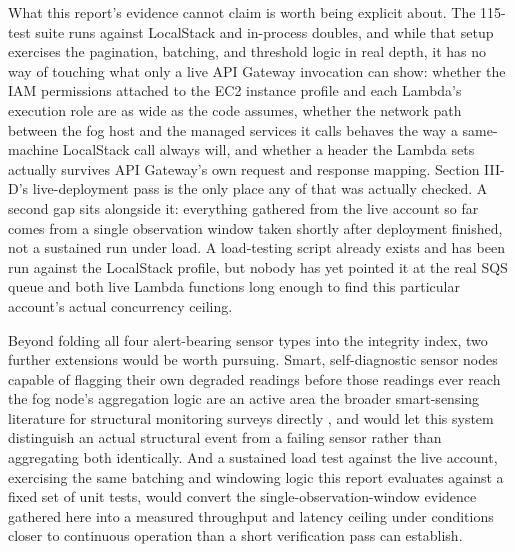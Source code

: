 \documentclass[conference]{IEEEtran}
\begin{document}
What this report's evidence cannot claim is worth being explicit about. The 115-test suite runs against LocalStack and in-process doubles, and while that setup exercises the pagination, batching, and threshold logic in real depth, it has no way of touching what only a live API Gateway invocation can show: whether the IAM permissions attached to the EC2 instance profile and each Lambda's execution role are as wide as the code assumes, whether the network path between the fog host and the managed services it calls behaves the way a same-machine LocalStack call always will, and whether a header the Lambda sets actually survives API Gateway's own request and response mapping. Section III-D's live-deployment pass is the only place any of that was actually checked. A second gap sits alongside it: everything gathered from the live account so far comes from a single observation window taken shortly after deployment finished, not a sustained run under load. A load-testing script already exists and has been run against the LocalStack profile, but nobody has yet pointed it at the real SQS queue and both live Lambda functions long enough to find this particular account's actual concurrency ceiling.

Beyond folding all four alert-bearing sensor types into the integrity index, two further extensions would be worth pursuing. Smart, self-diagnostic sensor nodes capable of flagging their own degraded readings before those readings ever reach the fog node's aggregation logic are an active area the broader smart-sensing literature for structural monitoring surveys directly \cite{ref12}, and would let this system distinguish an actual structural event from a failing sensor rather than aggregating both identically. And a sustained load test against the live account, exercising the same batching and windowing logic this report evaluates against a fixed set of unit tests, would convert the single-observation-window evidence gathered here into a measured throughput and latency ceiling under conditions closer to continuous operation than a short verification pass can establish.
\end{document}
